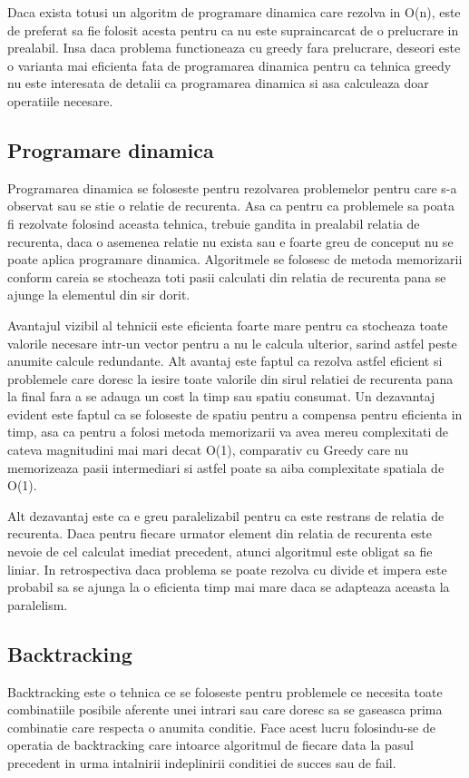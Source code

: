 \documentclass[runningheads]{llncs}
\begin{document}
Daca exista totusi un algoritm de programare dinamica care rezolva in O(n), este
de preferat sa fie folosit acesta pentru ca nu este supraincarcat de o prelucrare in prealabil. Insa daca
problema functioneaza cu greedy fara prelucrare, deseori este o varianta mai eficienta fata de programarea
dinamica pentru ca tehnica greedy nu este interesata de detalii ca programarea dinamica si asa calculeaza
doar operatiile necesare.
\subsection{Programare dinamica}
Programarea dinamica se foloseste pentru rezolvarea problemelor pentru care s-a observat sau se stie o relatie de
recurenta. Asa ca pentru ca problemele sa poata fi rezolvate folosind aceasta tehnica, trebuie gandita in prealabil
relatia de recurenta, daca o asemenea relatie nu exista sau e foarte greu de conceput nu se poate aplica
programare dinamica. Algoritmele se folosesc de metoda memorizarii conform careia se stocheaza toti pasii
calculati din relatia de recurenta pana se ajunge la elementul din sir dorit.

Avantajul vizibil al tehnicii este eficienta foarte mare pentru ca stocheaza toate valorile necesare intr-un
vector pentru a nu le calcula ulterior, sarind astfel peste anumite calcule redundante. Alt avantaj este faptul
ca rezolva astfel eficient si problemele care doresc la iesire toate valorile din sirul relatiei de recurenta
pana la final fara a se adauga un cost la timp sau spatiu consumat. Un dezavantaj evident este faptul ca se
foloseste de spatiu pentru a compensa pentru eficienta in timp, asa ca pentru a folosi metoda memorizarii
va avea mereu complexitati de cateva magnitudini mai mari decat O(1), comparativ cu Greedy care nu memorizeaza
pasii intermediari si astfel poate sa aiba complexitate spatiala de O(1).

Alt dezavantaj este ca e greu paralelizabil pentru ca este restrans de relatia de recurenta. Daca pentru
fiecare urmator element din relatia de recurenta este nevoie de cel calculat imediat precedent, atunci algoritmul
este obligat sa fie liniar. In retrospectiva daca problema se poate rezolva cu divide et impera este probabil
sa se ajunga la o eficienta timp mai mare daca se adapteaza aceasta la paralelism.
\subsection{Backtracking}
Backtracking este o tehnica ce se foloseste pentru problemele ce necesita toate combinatiile posibile aferente
unei intrari sau care doresc sa se gaseasca prima combinatie care respecta o anumita conditie. Face acest
lucru folosindu-se de operatia de backtracking care intoarce algoritmul de fiecare data la pasul precedent in urma
intalnirii indeplinirii conditiei de succes sau de fail.
\end{document}
